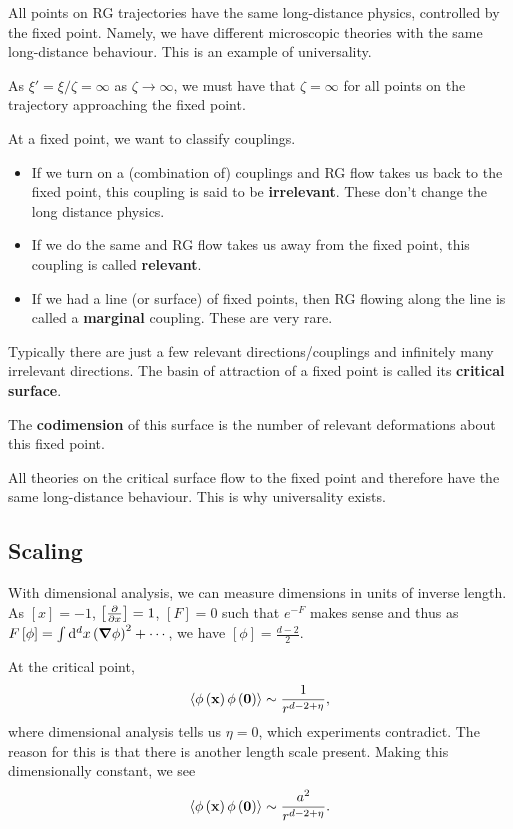 
All points on RG trajectories have the same long-distance physics, controlled by the fixed point. Namely, we have different microscopic theories with the same long-distance behaviour. This is an example of universality. 

As $\xi' = \xi / \zeta = \infty$ as $\zeta \to \infty$, we must have that $\zeta = \infty$ for all points on the trajectory approaching the fixed point.

At a fixed point, we want to classify couplings.
\begin{itemize}
    \item If we turn on a (combination of) couplings and RG flow takes us back to the fixed point, this coupling is said to be \textbf{irrelevant}. These don't change the long distance physics.
    \item If we do the same and RG flow takes us away from the fixed point, this coupling is called \textbf{relevant}.
    \item If we had a line (or surface) of fixed points, then RG flowing along the line is called a \textbf{marginal} coupling. These are very rare.
\end{itemize}

Typically there are just a few relevant directions/couplings and infinitely many irrelevant directions. The basin of attraction of a fixed point is called its \textbf{critical surface}.


The \textbf{codimension} of this surface is the number of relevant deformations about this fixed point.

All theories on the critical surface flow to the fixed point and therefore have the same long-distance behaviour. This is why universality exists.

\subsection{Scaling}

With dimensional analysis, we can measure dimensions in units of inverse length. As $\left[ x  \right] = -1$, $\left[ \pdv{x} \right]=1$, $\left[ F \right] = 0$ such that $e^{-F}$ makes sense and thus as $F\left[ \phi \right] = \int \dd{^{d}x} \left( \grad \phi \right)^2 + \cdots$, we have $\left[ \phi \right] = \frac{d - 2}{2}$.

At the critical point,
\begin{align}
    \left<\phi \left( \vb{x} \right) \phi \left( \vb{0} \right)  \right> \sim  \frac{1}{r^{d-2+\eta}}
,\end{align}
where dimensional analysis tells us $\eta = 0$, which experiments contradict. The reason for this is that there is another length scale present. Making this dimensionally constant, we see
\begin{align}
    \left<\phi \left( \vb{x} \right) \phi \left( \vb{0} \right)  \right> \sim  \frac{a^2}{r^{d-2+\eta}}
.\end{align}

